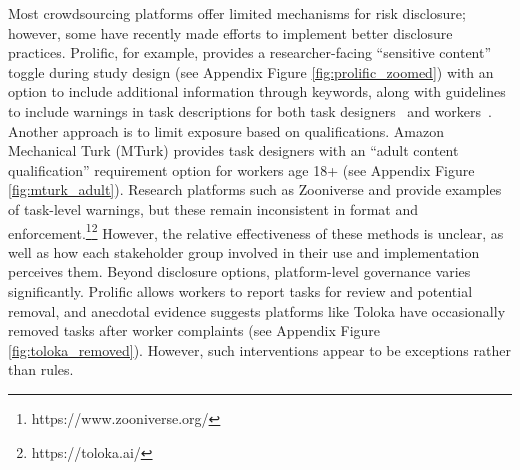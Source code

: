 Most crowdsourcing platforms offer limited mechanisms for risk disclosure; however, some have recently made efforts to implement better disclosure practices. %
Prolific, for example, provides a researcher-facing ``sensitive content'' toggle during study design (see Appendix Figure \ref{fig:prolific_zoomed}) with an option to include additional information through keywords, along with guidelines to include warnings in task descriptions for both task designers~\cite{ProlificResearcherSensitive2025, ProlificAPIContentWarning2025} and workers~\cite{prolific2025participant}. Another approach is to limit exposure based on qualifications. Amazon Mechanical Turk (MTurk) provides task designers with an ``adult content qualification'' requirement option for workers age 18+  (see Appendix Figure \ref{fig:mturk_adult}). Research platforms such as Zooniverse and  provide examples of task-level warnings, but these remain inconsistent in format and enforcement.\footnote{https://www.zooniverse.org/}\footnote{https://toloka.ai/} However, the relative effectiveness of these methods is unclear, as well as how each stakeholder group involved in their use and implementation perceives them.  
Beyond disclosure options, platform-level governance varies significantly. %
Prolific allows workers to report tasks for review and potential removal, and anecdotal evidence suggests platforms like Toloka have occasionally removed tasks after worker complaints (see Appendix Figure \ref{fig:toloka_removed}). However, such interventions appear to be exceptions rather than rules.

